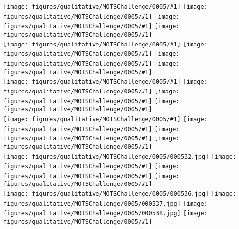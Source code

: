 \documentclass[10pt,twocolumn,letterpaper]{article}
\begin{document}
\newcommand{\imgmots}[1] {\texttt{[image: figures/qualitative/MOTSChallenge/0005/\#1]}}  
\begin{figure*}[t!]
	\centering
\imgmots{000516.jpg}
		\vspace{1.2pt}
		\imgmots{000517.jpg}
		\imgmots{000518.jpg}
		\imgmots{000519.jpg}
		\\
		
		\imgmots{000520.jpg}
		\vspace{1.2pt}
		\imgmots{000521.jpg}
		\imgmots{000522.jpg}
		\imgmots{000523.jpg}
		\\
		
		\imgmots{000524.jpg}
		\vspace{1.2pt}
		\imgmots{000525.jpg}
		\imgmots{000526.jpg}
		\imgmots{000527.jpg}
		\\
		
		\imgmots{000528.jpg}
		\vspace{1.2pt}
		\imgmots{000529.jpg}
		\imgmots{000530.jpg}
		\imgmots{000531.jpg}
		\\
		
\texttt{[image: figures/qualitative/MOTSChallenge/0005/000532.jpg]}
		\vspace{1.2pt}
		\imgmots{000533.jpg}
		\imgmots{000534.jpg}
		\imgmots{000535.jpg}
		\\
		
\texttt{[image: figures/qualitative/MOTSChallenge/0005/000536.jpg]}
		\vspace{1.2pt}
\texttt{[image: figures/qualitative/MOTSChallenge/0005/000537.jpg]}
		\texttt{[image: figures/qualitative/MOTSChallenge/0005/000538.jpg]}
		\imgmots{000539.jpg}
		\\
\vspace{-6pt}\caption{\textbf{Qualitative Results on MOTSChallenge.} While complex scenes with many occluding objects often work well, there can still be missing detections and id switches during difficult occlusions, as in this example (highlighted by red ellipses).
	}
	\label{fig:mots-results1}
\end{figure*}
\end{document}
